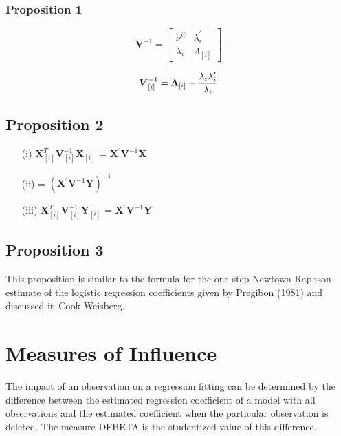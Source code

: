 \documentclass[12pt, a4paper]{report}
\theoremstyle{plain}
\theoremstyle{definition}
\theoremstyle{remark}
\begin{document}
\subsubsection{Proposition 1}


\[
\boldsymbol{V}^{-1} =
\left[ \begin{array}{cc}
\nu^{ii} & \lambda_{i}^{\prime}  \\
\lambda_{i} & \Lambda_{[i]}
\end{array}\right] \]




\[\boldsymbol{V}_{[i]}^{-1} = \boldsymbol{\Lambda}_{[i]} - { \lambda_{i} \lambda_{i} ^{\prime} \over \lambda_{i} } \]


\subsection{Proposition 2}


\begin{itemize}
\item[(i)] $ \boldsymbol{X}_{[i]}^{T}\boldsymbol{V}^{-1}_{[i]}\boldsymbol{X}_{[i]}$ = $\boldsymbol{X}^{\prime}\boldsymbol{V}^{-1}\boldsymbol{X}$
\item[(ii)] = $(\boldsymbol{X}^{\prime}\boldsymbol{V}^{-1}\boldsymbol{Y})^{-1}$
\item[(iii)] $ \boldsymbol{X}_{[i]}^{T}\boldsymbol{V}^{-1}_{[i]}\boldsymbol{Y}_{[i]}$ = $\boldsymbol{X}^{\prime}\boldsymbol{V}^{-1}\boldsymbol{Y}$
\end{itemize}
\subsection{Proposition 3}
This proposition is similar to the formula for the one-step Newtown Raphson estimate of the logistic regression coefficients given by Pregibon (1981) and discussed in Cook Weisberg.






\newpage
\section{Measures of Influence} %


The impact of an observation on a regression fitting can be determined by the difference between the estimated regression coefficient of a model with all observations and the estimated coefficient when the particular observation is deleted. The measure DFBETA is the studentized value of this difference.
\end{document}
